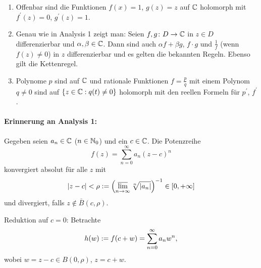 \documentclass[a4paper,twoside,DIV15,BCOR12mm]{scrbook}
\begin{document}
\begin{bem} \label{bem1.2}
\begin{enumerate}
\item Offenbar sind die Funktionen $f(x)=1$, $g(z)=z$ auf $\mathbb{C}$ holomorph mit $f^\prime(z)=0$, $g^\prime(z)=1$.
\item Genau wie in Analysis 1 zeigt man: Seien $f, g\colon D \to \mathbb{C}$ in $z\in D$ differenzierbar und $\alpha, \beta \in
  \mathbb{C}$. Dann sind auch $\alpha f + \beta g$, $f\cdot g$ und $\frac1f$ (wenn $f(z)\neq0$) in $z$ differenzierbar und es gelten die
  bekannten Regeln. Ebenso gilt die Kettenregel.
\item Polynome $p$ sind auf $\mathbb{C}$ und rationale Funktionen $f = \frac{p}{q}$ mit einem Polynom $q \neq 0$ sind auf $\{z\in\mathbb{C}:
  q(t) \neq 0\}$ holomorph mit den reellen Formeln für $p^\prime$, $f^\prime$.
\end{enumerate}
\end{bem}

\paragraph{Erinnerung an Analysis 1:} Gegeben seien $a_n\in\mathbb{C}$ ($n\in\mathbb{N}_0$) und ein $c\in\mathbb{C}$. Die Potenzreihe
\[f(z) = \sum_{n=0}^\infty a_n(z-c)^n\]
konvergiert absolut für alle $z$ mit
\[|z-c| < \rho := \left(\varlimsup_{n\rightarrow\infty}\sqrt[n]{|a_n|}\right)^{-1}\in[0,+\infty]\] 
und divergiert, falls $z\notin \bar{B}(c,\rho)$.

Reduktion auf $c=0$: Betrachte
\[h(w) := f(c+w) = \sum_{n=0}^\infty a_n w^n,\]
wobei $w=z-c\in B(0,\rho)$, $z=c+w$.
\end{document}
